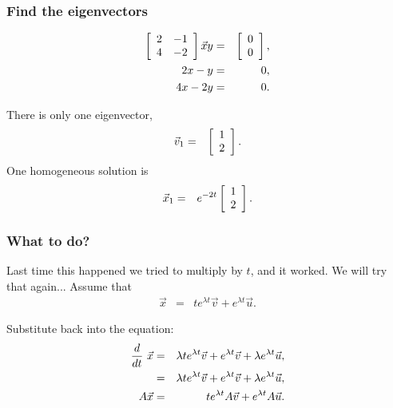 \begin{frame}
  \frametitle{Find the eigenvectors}

  \begin{eqnarray*}
    \arrayTwo{2}{-1}{4}{-2} \vec{x}{y} & = & \vecTwo{0}{0}, \\
    2x - y & = & 0, \\
    4x - 2y & = & 0.
  \end{eqnarray*}

  There is only one eigenvector,
  \begin{eqnarray*}
    \vec{v}_1 & = & \vecTwo{1}{2}.
  \end{eqnarray*}
  One homogeneous solution is 
  \begin{eqnarray*}
   \vec{x}_1 & = & e^{-2t}\vecTwo{1}{2}.
  \end{eqnarray*}

\end{frame}

\begin{frame}
  \frametitle{What to do?}

  Last time this happened we tried to multiply by $t$, and it
  worked. We will try that again...
  Assume that
  \begin{eqnarray*}
    \vec{x} & = & t e^{\lambda t} \vec{v} + e^{\lambda t} \vec{u}.
  \end{eqnarray*}

  {
    Substitute back into the equation:
    \begin{eqnarray*}
      \deriv{~}{t} \vec{x} & = & \lambda t e^{\lambda t} \vec{v} + e^{\lambda t} \vec{v} 
         + \lambda e^{\lambda t} \vec{u}, \\
         & = & 
      \lambda t e^{\lambda t} \vec{v} + e^{\lambda t} \vec{v} + \lambda e^{\lambda t} \vec{u}, \\
      A\vec{x} & = & t e^{\lambda t} A \vec{v} + e^{\lambda t} A \vec{u}.
    \end{eqnarray*}
  }
  
\end{frame}


